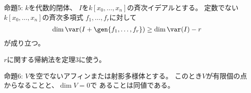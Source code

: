 \begin{framed}
  命題5:
  $k$を代数的閉体、
  $I$を$k[x_0,\dots,x_n]$の斉次イデアルとする。
  定数でない$k[x_0,\dots,x_n]$の斉次多項式
  $f_1,\dots,f_r$に対して
  \begin{align}
    \dim \var(I+\gen{f_1,\dots,f_r}) \ge \dim \var(I)- r
  \end{align}
  が成り立つ。
\end{framed}
\begin{myproof}
  $r$に関する帰納法を定理3に使う。
\end{myproof}

\begin{framed}
  命題6:
  $V$を空でないアフィンまたは射影多様体とする。
  このとき$V$が有限個の点からなることと、$\dim V = 0$で
  あることは同値である。
\end{framed}
